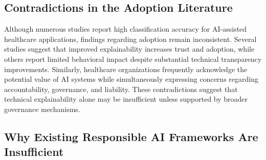 \subsection{Contradictions in the Adoption Literature}
\label{sec:contradictions_adoption_literature}

\noindent Although numerous studies report high classification accuracy for AI-assisted healthcare applications, findings regarding adoption remain inconsistent. Several studies suggest that improved explainability increases trust and adoption, while others report limited behavioral impact despite substantial technical transparency improvements. Similarly, healthcare organizations frequently acknowledge the potential value of AI systems while simultaneously expressing concerns regarding accountability, governance, and liability. These contradictions suggest that technical explainability alone may be insufficient unless supported by broader governance mechanisms.


\subsection{Why Existing Responsible AI Frameworks Are Insufficient}
\label{sec:why_existing_frameworks_insufficient}

